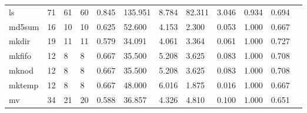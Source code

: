 \begin{longtable}{lp{1.00cm}p{1.00cm}p{1.00cm}p{1.00cm}p{1.00cm}p{1.00cm}p{1.00cm}p{1.00cm}p{1.00cm}p{1.00cm}p{1.00cm}}
ls        &                           71 &                 61 &                                60 &                                      0.845 &                                135.951 &                                        8.784 &                            82.311 &                                   3.046 &                        0.934 &                                        0.694 \\
md5sum    &                           16 &                 10 &                                10 &                                      0.625 &                                 52.600 &                                        4.153 &                             2.300 &                                   0.053 &                        1.000 &                                        0.667 \\
mkdir     &                           19 &                 11 &                                11 &                                      0.579 &                                 34.091 &                                        4.061 &                             3.364 &                                   0.061 &                        1.000 &                                        0.727 \\
mkfifo    &                           12 &                  8 &                                 8 &                                      0.667 &                                 35.500 &                                        5.208 &                             3.625 &                                   0.083 &                        1.000 &                                        0.708 \\
mknod     &                           12 &                  8 &                                 8 &                                      0.667 &                                 35.500 &                                        5.208 &                             3.625 &                                   0.083 &                        1.000 &                                        0.708 \\
mktemp    &                           12 &                  8 &                                 8 &                                      0.667 &                                 48.000 &                                        6.016 &                             1.875 &                                   0.016 &                        1.000 &                                        0.667 \\
mv        &                           34 &                 21 &                                20 &                                      0.588 &                                 36.857 &                                        4.326 &                             4.810 &                                   0.100 &                        1.000 &                                        0.651 \\

\end{longtable}

